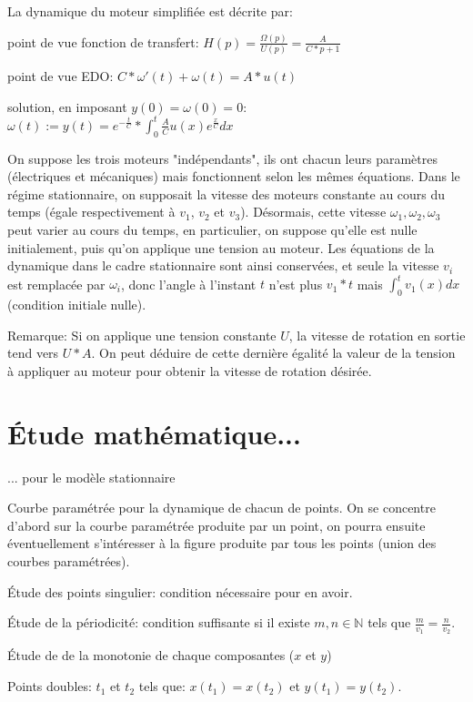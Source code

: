 \documentclass[11pt,a4paper]{article}
\newcommand{\N}{\mathbb N}%
\begin{document}
La dynamique du moteur simplifiée est décrite par:

point de vue fonction de transfert:
$ H(p) = \frac{\Omega(p)}{U(p)} = \frac{A}{C*p+1}$

point de vue EDO:
$C * \omega'(t) + \omega(t) = A*u(t)$


solution, en imposant $y(0) = \omega(0) = 0$: $\omega(t) := y(t) = e^{-\frac{t}{C}} * \int_0^t \frac{A}{C} u(x) e^{\frac{x}{C}} dx $


On suppose les trois moteurs "indépendants", ils ont chacun leurs paramètres (électriques et mécaniques) mais fonctionnent selon les mêmes équations.
Dans le régime stationnaire, on supposait la vitesse des moteurs constante au cours du temps (égale  respectivement à $v_1$, $v_2$ et $v_3$). Désormais, cette vitesse $\omega_1, \omega_2, \omega_3$ peut varier au cours du temps, en particulier, on suppose qu'elle est nulle initialement, puis qu'on applique une tension au moteur. Les équations de la dynamique dans le cadre stationnaire sont ainsi conservées, et seule la vitesse $v_i$ est remplacée par $\omega_i$, donc l'angle à l'instant $t$ n'est plus $v_1 *t$ mais $ \int_0^t v_1(x)dx$ (condition initiale nulle).

Remarque: Si on applique une tension constante $U$, la vitesse de rotation en sortie tend vers $U*A$. On peut déduire de cette dernière égalité la valeur de la tension à appliquer au moteur pour obtenir la vitesse de rotation désirée.




\section{Étude mathématique...}
... pour le modèle stationnaire

Courbe paramétrée pour la dynamique de chacun de points. On se concentre d'abord sur la courbe paramétrée produite par un point, on pourra ensuite éventuellement s'intéresser à la figure produite par tous les points (union des courbes paramétrées).

Étude des points singulier: condition nécessaire pour en avoir.

Étude de la périodicité: condition suffisante si il existe $m,n \in \N$ tels que $ \frac{m}{v_1}= \frac{n}{v_2}$. 

Étude de de la monotonie de chaque composantes ($x$ et $y$) 

Points doubles: $t_1$ et $t_2$ tels que: $x(t_1)=x(t_2)$ et $y(t_1) = y(t_2)$.
\end{document}
